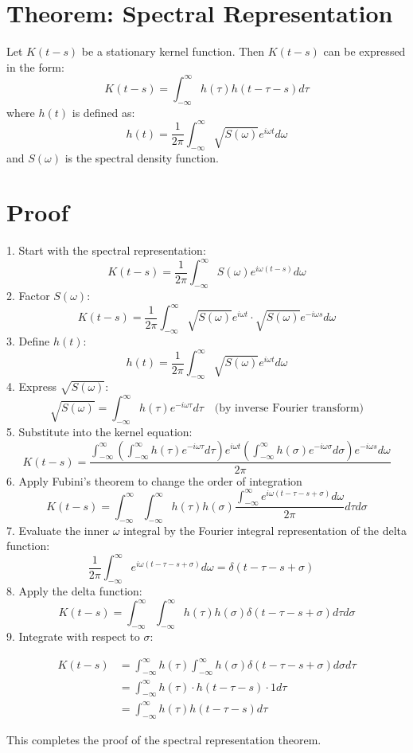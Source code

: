 \documentclass{article}
\begin{document}
\section{Theorem: Spectral Representation}

Let $K (t - s)$ be a stationary kernel function. Then $K (t - s)$ can be
expressed in the form:
\[ K (t - s) = \int_{- \infty}^{\infty} h (\tau) h (t - \tau - s) d \tau \]
where $h (t)$ is defined as:
\[ h (t) = \frac{1}{2 \pi}  \int_{- \infty}^{\infty} \sqrt{S (\omega)} e^{i
   \omega t} d \omega \]
and $S (\omega)$ is the spectral density function.

\section{Proof}

1. Start with the spectral representation:
\[ K (t - s) = \frac{1}{2 \pi}  \int_{- \infty}^{\infty} S (\omega) e^{i
   \omega (t - s)} d \omega \]
2. Factor $S (\omega)$:
\[ K (t - s) = \frac{1}{2 \pi}  \int_{- \infty}^{\infty} \sqrt{S (\omega)}
   e^{i \omega t} \cdot \sqrt{S (\omega)} e^{- i \omega s} d \omega \]
3. Define $h (t)$:
\[ h (t) = \frac{1}{2 \pi}  \int_{- \infty}^{\infty} \sqrt{S (\omega)} e^{i
   \omega t} d \omega \]
4. Express $\sqrt{S (\omega)}$:
\[ \sqrt{S (\omega)} = \int_{- \infty}^{\infty} h (\tau) e^{- i \omega \tau} d
   \tau \quad \text{(by inverse Fourier transform)} \]
5. Substitute into the kernel equation:
\[ K (t - s) = \frac{ \int_{- \infty}^{\infty}  \left( \int_{-
   \infty}^{\infty} h (\tau) e^{- i \omega \tau} d \tau \right) e^{i \omega t}
   \left( \int_{- \infty}^{\infty} h (\sigma) e^{- i \omega \sigma} d \sigma
   \right) e^{- i \omega s} d \omega}{2 \pi} \]
6. Apply Fubini's theorem to change the order of integration
\[ K (t - s) = \int_{- \infty}^{\infty}  \int_{- \infty}^{\infty} h (\tau) h
   (\sigma)  \frac{\int_{- \infty}^{\infty} e^{i \omega (t - \tau - s +
   \sigma)} d \omega}{2 \pi} d \tau d \sigma \]
7. Evaluate the inner $\omega$ integral by the Fourier integral representation
of the delta function:
\[ \frac{1}{2 \pi}  \int_{- \infty}^{\infty} e^{i \omega (t - \tau - s +
   \sigma)} d \omega = \delta (t - \tau - s + \sigma) \quad \]
8. Apply the delta function:
\[ K (t - s) = \int_{- \infty}^{\infty}  \int_{- \infty}^{\infty} h (\tau) h
   (\sigma) \delta (t - \tau - s + \sigma) d \tau d \sigma \]
9. Integrate with respect to $\sigma$:

\begin{align*}
  K (t - s) & = \int_{- \infty}^{\infty} h (\tau)  \int_{- \infty}^{\infty} h
  (\sigma) \delta (t - \tau - s + \sigma) d \sigma d \tau\\
  & = \int_{- \infty}^{\infty} h (\tau) \cdot h (t - \tau - s) \cdot 1 d
  \tau\\
  & = \int_{- \infty}^{\infty} h (\tau) h (t - \tau - s) d \tau
\end{align*}

This completes the proof of the spectral representation theorem.
\end{document}
